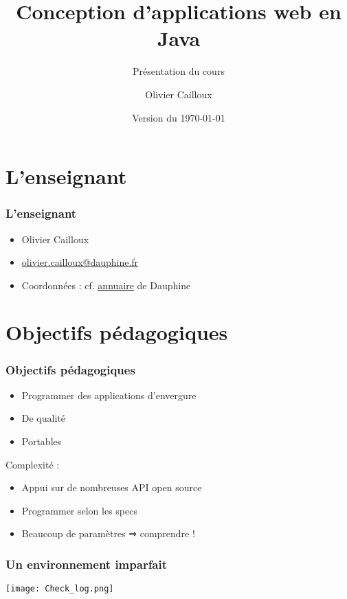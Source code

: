 \documentclass[english, french]{beamer}
\title{Conception d’applications web en Java}
\subtitle{Présentation du cours}
\author{Olivier Cailloux}
\institute[LAMSADE]{LAMSADE, Université Paris-Dauphine}
\date{Version du \today}
\begin{document}


\begin{frame}[plain]
   \titlepage
\end{frame}
\addtocounter{framenumber}{-1}

\section{L’enseignant}
\begin{frame}
	\frametitle{L’enseignant}
	\begin{itemize}
		\item Olivier Cailloux
		\item \href{mailto:olivier.cailloux@dauphine.fr}{olivier.cailloux@dauphine.fr}
		\item Coordonnées : cf. \href{https://www.ent.dauphine.fr/Annuaire/index.php?param0=fiche&param1=ocailloux}{annuaire} de Dauphine
	\end{itemize}
\end{frame}

\section[Obj. pédagogiques]{Objectifs pédagogiques}
\begin{frame}
	\frametitle{Objectifs pédagogiques}
	\begin{itemize}
		\item Programmer des applications d’envergure
		\item De qualité
		\item Portables
	\end{itemize}
	Complexité :
	\begin{itemize}
		\item Appui sur de nombreuses API open source
		\item Programmer selon les specs
		\item Beaucoup de paramètres ⇒ comprendre !
	\end{itemize}
\end{frame}

\begin{frame}[fragile]
	\frametitle{Un environnement imparfait}
	\begin{minipage}{\columnwidth+15mm}
	\hspace{-8mm}%
	\texttt{[image: Check\_log.png]}%
	\end{minipage}
\end{frame}
\end{document}
